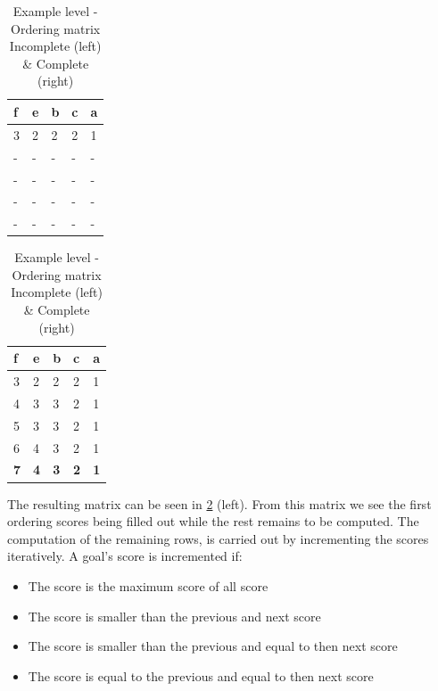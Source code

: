 \begin{table}[h!]
  \caption{\label{tab:example_matrix}\centering Example level - Ordering matrix \break Incomplete (left) \& Complete (right)}
	\begin{minipage}{.5\linewidth}
    \centering
    \begin{tabular}{@{}lllll@{}}
		\toprule
		\textbf{f} & \textbf{e} & \textbf{b} & \textbf{c} & \textbf{a} \\ \midrule
		3          & 2          & 2          & 2          & 1          \\
		-          & -          & -          & -          & -          \\
		-          & -          & -          & -          & -          \\
		-          & -          & -          & -          & -          \\
		-          & -          & -          & -          & -          \\ \bottomrule
		\end{tabular}
  \end{minipage}%
  \begin{minipage}{.5\linewidth}
    \centering
    \begin{tabular}{@{}lllll@{}}
		\toprule
		\textbf{f} & \textbf{e} & \textbf{b} & \textbf{c} & \textbf{a} \\ \midrule
		3          & 2          & 2          & 2          & 1          \\
		4          & 3          & 3          & 2          & 1          \\
		5          & 3          & 3          & 2          & 1          \\
		6          & 4          & 3          & 2          & 1          \\ \midrule
		\textbf{7} & \textbf{4} & \textbf{3} & \textbf{2} & \textbf{1} \\ \bottomrule
		\end{tabular}
  \end{minipage}
\end{table}

The resulting matrix can be seen in \cref{tab:example_matrix} (left).
From this matrix we see the first ordering scores being filled out while the rest remains to be computed.
The computation of the remaining rows, is carried out by incrementing the scores iteratively.
A goal's score is incremented if:

\begin{itemize}
\item{The score is the maximum score of all score}
\item{The score is smaller than the previous and next score }
\item{The score is smaller than the previous and equal to then next score}
\item{The score is equal to the previous and equal to then next score}
\end{itemize}

